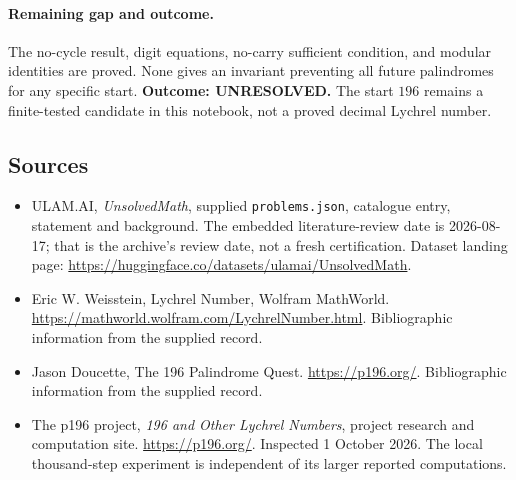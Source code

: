 \documentclass[11pt,a4paper]{article}
\begin{document}
\paragraph{Remaining gap and outcome.}
The no-cycle result, digit equations, no-carry sufficient condition,
and modular identities are proved. None gives an invariant preventing
all future palindromes for any specific start. \textbf{Outcome:
UNRESOLVED.} The start $196$ remains a finite-tested candidate in this
notebook, not a proved decimal Lychrel number.

\subsection{Sources}

{\small

\begin{itemize}

\item[\hypertarget{source:statement:1}{S1}] ULAM.AI, \emph{UnsolvedMath}, supplied \texttt{problems.json}, catalogue entry, statement and background. The embedded literature-review date is 2026-08-17; that is the archive’s review date, not a fresh certification. Dataset landing page: \url{https://huggingface.co/datasets/ulamai/UnsolvedMath}.

\item[\hypertarget{source:statement:2}{S2}] Eric W. Weisstein, Lychrel Number, Wolfram MathWorld. \url{https://mathworld.wolfram.com/LychrelNumber.html}. Bibliographic information from the supplied record.

\item[\hypertarget{source:statement:3}{S3}] Jason Doucette, The 196 Palindrome Quest. \url{https://p196.org/}. Bibliographic information from the supplied record.


\item[E1] The p196 project, \emph{196 and Other Lychrel Numbers},
project research and computation site. \url{https://p196.org/}.
Inspected 1 October 2026. The local thousand-step experiment is
independent of its larger reported computations.

\end{itemize}

}

\label{end:statement}
\end{document}
